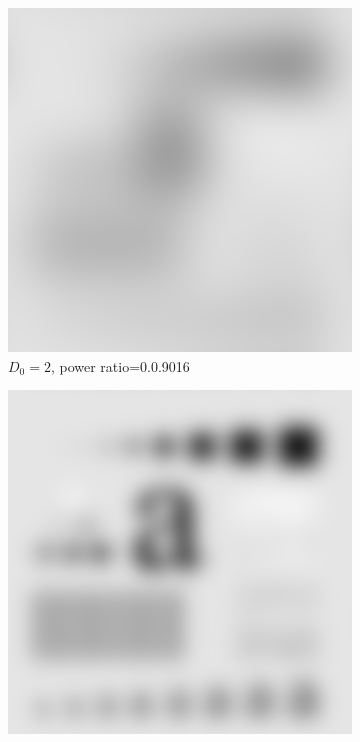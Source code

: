 \begin{figure}[h!]
	\centering
	\begin{subfigure}[b]{0.45\linewidth}
		\includegraphics[width=\linewidth]{myfigure/p3/GLPF_2.png}
		\caption{$D_0=2$, power ratio=0.0.9016}
		\label{fig:GLPF_2}
	\end{subfigure}
	\begin{subfigure}[b]{0.45\linewidth}
		\includegraphics[width=\linewidth]{myfigure/p3/GLPF_5.png}

\end{subfigure}
\end{figure}
